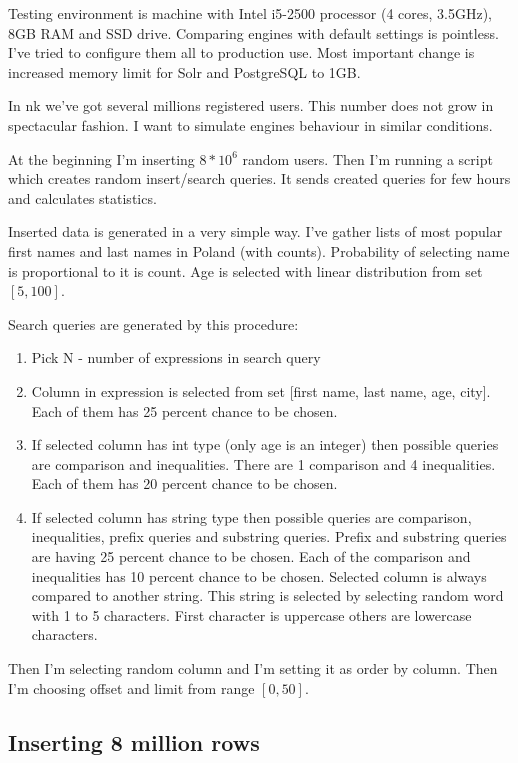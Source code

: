\documentclass[10pt,a4paper]{article}
\begin{document}
Testing environment is machine with Intel i5-2500 processor (4 cores, 3.5GHz), 8GB RAM and SSD drive. Comparing engines with default settings is pointless. I've tried to configure them all to production use. Most important change is increased memory limit for Solr and PostgreSQL to 1GB.

In nk we've got several millions registered users. This number does not grow in spectacular fashion. I want to simulate engines behaviour in similar conditions. 

At the beginning I'm inserting $8 * 10^6$ random users. Then I'm running a script which creates random insert/search queries. It sends created queries for few hours and calculates statistics.

Inserted data is generated in a very simple way. I've gather lists of most popular first names and last names in Poland (with counts). Probability of selecting name is proportional to it is count. Age is selected with linear distribution from set $[5, 100]$.

Search queries are generated by this procedure:
\begin{enumerate}
\item Pick N - number of expressions in search query
\item Column in expression is selected from set [first name, last name, age, city]. Each of them has 25 percent chance to be chosen.
\item If selected column has int type (only age is an integer) then possible queries are comparison and inequalities. There are 1 comparison and 4 inequalities. Each of them has 20 percent chance to be chosen.
\item If selected column has string type then possible queries are comparison, inequalities, prefix queries and substring queries. Prefix and substring queries are having 25 percent chance to be chosen. Each of the comparison and inequalities has 10 percent chance to be chosen. Selected column is always compared to another string. This string is selected by selecting random word with 1 to 5 characters. First character is uppercase others are lowercase characters. 
\end{enumerate}

Then I'm selecting random column and I'm setting it as order by column. Then I'm choosing offset and limit from range $[0, 50]$.

\subsection{Inserting 8 million rows}
\end{document}
